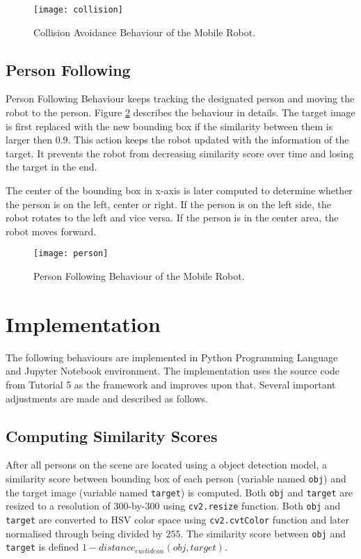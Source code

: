 \begin{figure}
\centering
\texttt{[image: collision]}
\caption{Collision Avoidance Behaviour of the Mobile Robot.}
\label{fig:collision}
\end{figure}

\subsection{Person Following}
Person Following Behaviour keeps tracking the designated person and moving the robot to the person.
Figure \ref{fig:person} describes the behaviour in details.
The target image is first replaced with the new bounding box if the similarity between them is larger then $0.9$.
This action keeps the robot updated with the information of the target. It prevents the robot from decreasing similarity score over time and losing the target in the end.

The center of the bounding box in x-axis is later computed to determine whether the person is on the left, center or right.
If the person is on the left side, the robot rotates to the left and vice versa.
If the person is in the center area, the robot moves forward.


\begin{figure}
\centering
\texttt{[image: person]}
\caption{Person Following Behaviour of the Mobile Robot.}
\label{fig:person}
\end{figure}

\section{Implementation}
The following behaviours are implemented in Python Programming Language and Jupyter Notebook environment.
The implementation uses the source code from Tutorial 5 as the framework and improves upon that.
Several important adjustments are made and described as follows.

\subsection{Computing Similarity Scores}
After all persons on the scene are located using a object detection model, a similarity score between bounding box of each person (variable named \texttt{obj}) and the target image (variable named \texttt{target}) is computed.
Both \texttt{obj} and \texttt{target} are resized to a resolution of 300-by-300 using \texttt{cv2.resize} function.
Both \texttt{obj} and \texttt{target} are converted to HSV color space using \texttt{cv2.cvtColor} function and later normalised through being divided by $255$.
The similarity score between \texttt{obj} and \texttt{target} is defined $1 - distance_{euclidean}(obj, target)$.

